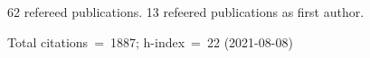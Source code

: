 62 refereed publications. 13 refeered publications as first author.

Total citations~=~1887; h-index~=~22 (2021-08-08)
